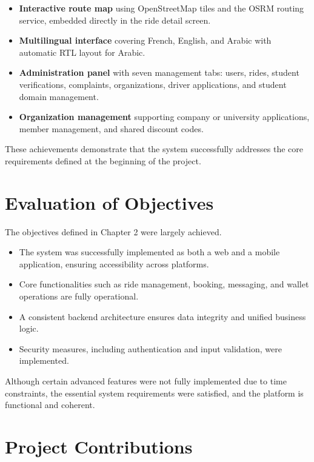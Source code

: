 \begin{itemize}[noitemsep]
    \item \textbf{Interactive route map} using OpenStreetMap tiles and the OSRM routing service, embedded directly in the ride detail screen.
    \item \textbf{Multilingual interface} covering French, English, and Arabic with automatic RTL layout for Arabic.
    \item \textbf{Administration panel} with seven management tabs: users, rides, student verifications, complaints, organizations, driver applications, and student domain management.
    \item \textbf{Organization management} supporting company or university applications, member management, and shared discount codes.
\end{itemize}

These achievements demonstrate that the system successfully addresses the core requirements defined at the beginning of the project.

\section{Evaluation of Objectives}

The objectives defined in Chapter 2 were largely achieved.

\begin{itemize}[noitemsep]
    \item The system was successfully implemented as both a web and a mobile application, ensuring accessibility across platforms.
    \item Core functionalities such as ride management, booking, messaging, and wallet operations are fully operational.
    \item A consistent backend architecture ensures data integrity and unified business logic.
    \item Security measures, including authentication and input validation, were implemented.
\end{itemize}

Although certain advanced features were not fully implemented due to time constraints, the essential system requirements were satisfied, and the platform is functional and coherent.

\section{Project Contributions}

